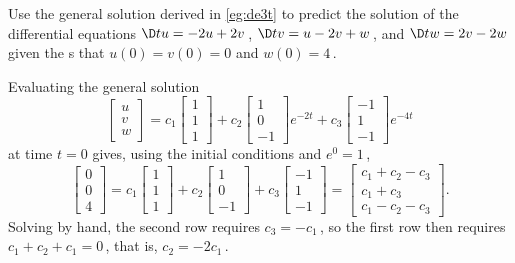 \begin{example} \label{eg:}
Use the general solution derived in \autoref{eg:de3t} to predict the solution of the differential equations \(\D tu=-2u+2v\)\,, \(\D tv=u-2v+w\)\,, and \(\D tw=2v-2w\) given the s that \(u(0)=v(0)=0\) and \(w(0)=4\)\,.
\begin{solution} 
Evaluating the general solution
\begin{equation*}
\begin{bmatrix} u\\v\\w \end{bmatrix}
=c_1\begin{bmatrix} 1\\1\\1 \end{bmatrix}
+c_2\begin{bmatrix} 1\\0\\-1 \end{bmatrix}e^{-2t}
+c_3\begin{bmatrix} -1\\1\\-1 \end{bmatrix}e^{-4t}
\end{equation*}
at time \(t=0\) gives, using the initial conditions and \(e^0=1\)\,,
\begin{equation*}
\begin{bmatrix} 0\\0\\4 \end{bmatrix}
=c_1\begin{bmatrix} 1\\1\\1 \end{bmatrix}
+c_2\begin{bmatrix} 1\\0\\-1 \end{bmatrix}
+c_3\begin{bmatrix} -1\\1\\-1 \end{bmatrix}
=\begin{bmatrix} c_1+c_2-c_3\\c_1+c_3\\c_1-c_2-c_3 \end{bmatrix}.
\end{equation*}
Solving by hand, the second row requires \(c_3=-c_1\)\,, so the first row then requires \(c_1+c_2+c_1=0\)\,, that is, \(c_2=-2c_1\)\,.

\end{solution}
\end{example}
